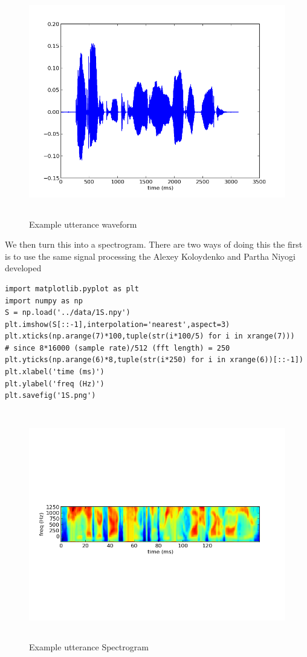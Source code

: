 \documentclass[11pt]{article}
\begin{document}
\begin{figure}[htb]
\centering
\includegraphics[height=10cm]{./1s.png}
\caption{\label{fig:1s}Example utterance waveform}
\end{figure}

We then turn this into a spectrogram.  There are two ways of doing this
the first is to use the same signal processing the Alexey Koloydenko
and Partha Niyogi developed




\begin{verbatim}
import matplotlib.pyplot as plt
import numpy as np
S = np.load('../data/1S.npy')
plt.imshow(S[::-1],interpolation='nearest',aspect=3)
plt.xticks(np.arange(7)*100,tuple(str(i*100/5) for i in xrange(7)))
# since 8*16000 (sample rate)/512 (fft length) = 250
plt.yticks(np.arange(6)*8,tuple(str(i*250) for i in xrange(6))[::-1])
plt.xlabel('time (ms)')
plt.ylabel('freq (Hz)')
plt.savefig('1S.png')
\end{verbatim}




\begin{figure}[htb]
\centering
\includegraphics[height=10cm]{./1S.png}
\caption{\label{fig:1S}Example utterance Spectrogram}
\end{figure}
\end{document}
